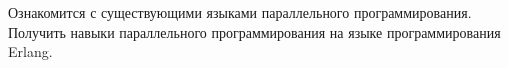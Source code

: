 
Ознакомится с существующими языками параллельного программирования. Получить навыки параллельного программирования на языке программирования Erlang.

